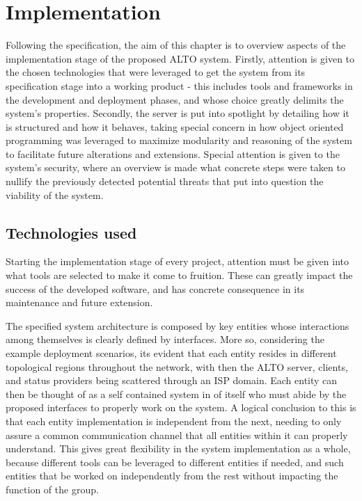 \chapter{Implementation}

    Following the specification, the aim of this chapter is to overview aspects of the implementation stage of the proposed ALTO system.
    Firstly, attention is given to the chosen technologies that were leveraged to get the system from its specification stage into a working product - this includes tools and frameworks in the development and deployment phases, and whose choice greatly delimits the system's properties.
    Secondly, the server is put into spotlight by detailing how it is structured and how it behaves, taking special concern in how object oriented programming was leveraged to maximize modularity and reasoning of the system to facilitate future alterations and extensions.
    Special attention is given to the system's security, where an overview is made what concrete steps were taken to nullify the previously detected potential threats that put into question the viability of the system.

\section{Technologies used}

    Starting the implementation stage of every project, attention must be given into what tools are selected to make it come to fruition.
    These can greatly impact the success of the developed software, and has concrete consequence in its maintenance and future extension.

    The specified system architecture is composed by key entities whose interactions among themselves is clearly defined by interfaces.
    More so, considering the example deployment scenarios, its evident that each entity resides in different topological regions throughout the network, with then the ALTO server, clients, and status providers being scattered through an ISP domain.
    Each entity can then be thought of as a self contained system in of itself who must abide by the proposed interfaces to properly work on the system.
    A logical conclusion to this is that each entity implementation is independent from the next, needing to only assure a common communication channel that all entities within it can properly understand.
    This gives great flexibility in the system implementation as a whole, because different tools can be leveraged to different entities if needed, and such entities that be worked on independently from the rest without impacting the function of the group.

